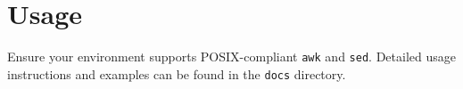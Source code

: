 \section{Usage}
Ensure your environment supports POSIX-compliant \texttt{awk} and \texttt{sed}. Detailed usage instructions and examples can be found in the \texttt{docs} directory.
\newpage
